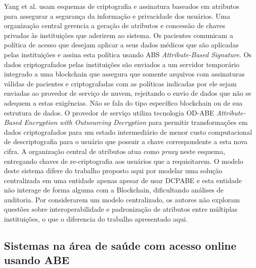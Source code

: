 \documentclass[a4paper,11pt]{article}
\begin{document}
Yang et al. \cite{Yang2020} usam esquemas de criptografia e assinatura baseados em atributos para assegurar a segurança da informação e privacidade dos usuários.
Uma organização central gerencia a geração de atributos e concessão de chaves privadas às instituições que aderirem ao sistema.
Os pacientes comunicam a política de acesso que desejam aplicar a seus dados médicos que são aplicadas pelas instituições e assina esta política usando ABS \emph{Attribute-Based Signature}.
Os dados criptografados pelas instituições são enviados a um servidor temporário integrado a uma blockchain que assegura que somente arquivos com assinaturas válidas de pacientes e criptografadas com as políticas indicadas por ele sejam enviadas ao provedor de serviço de nuvem, rejeitando o envio de dados que não se adequem a estas exigências.
Não se fala do tipo específico blockchain ou de sua estrutura de dados.
O provedor de serviço utiliza tecnologia OD-ABE \emph{Attribute-Based Encryption with Outsourcing Decryption} para permitir transformações em dados criptografados para um estado intermediário de menor custo computacional de descriptografia para o usuário que possuir a chave correspondente a esta nova cifra.
A organização central de atributos atua como \emph{proxy} neste esquema, entregando chaves de re-criptografia aos usuários que a requisitarem.
O modelo deste sistema difere do trabalho proposto aqui por modelar uma solução centralizada em uma entidade apenas apesar de usar DCPABE e esta entidade não interage de forma alguma com a Blockchain, dificultando análises de auditoria.
Por considerarem um modelo centralizado, os autores não exploram questões sobre interoperabilidade e padronização de atributos entre múltiplas instituições, o que o diferencia do trabalho apresentado aqui.

\subsection{Sistemas na área de saúde com acesso online usando ABE}
\label{sec:sub:saude-nuvem-cba}
\end{document}
